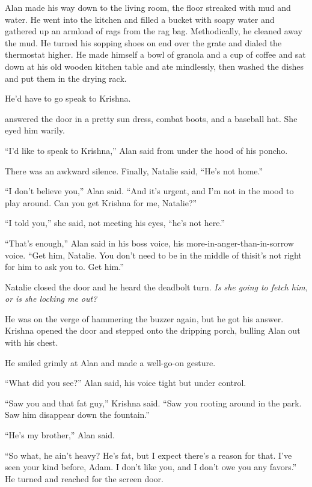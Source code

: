Alan made his way down to the living room, the floor streaked with mud
and water.  He went into the kitchen and filled a bucket with soapy
water and gathered up an armload of rags from the rag bag. 
Methodically, he cleaned away the mud.  He turned his sopping shoes on
end over the grate and dialed the thermostat higher.  He made himself
a bowl of granola and a cup of coffee and sat down at his old wooden
kitchen table and ate mindlessly, then washed the dishes and put them
in the drying rack.

He'd have to go speak to Krishna.

 answered the door in a pretty sun dress, combat boots, and a
baseball hat.  She eyed him warily.

``I'd like to speak to Krishna,'' Alan said from under the hood of his
poncho.

There was an awkward silence.  Finally, Natalie said, ``He's not
home.''

``I don't believe you,'' Alan said.  ``And it's urgent, and I'm not in
the mood to play around.  Can you get Krishna for me, Natalie?''

``I told you,'' she said, not meeting his eyes, ``he's not here.''

``That's enough,'' Alan said in his boss voice, his
more-in-anger-than-in-sorrow voice.  ``Get him, Natalie.  You don't
need to be in the middle of this\dash{}it's not right for him to ask you
to.  Get him.''

Natalie closed the door and he heard the deadbolt turn.  \textit{Is
she going to fetch him, or is she locking me out?}

He was on the verge of hammering the buzzer again, but he got his
answer.  Krishna opened the door and stepped onto the dripping porch,
bulling Alan out with his chest.

He smiled grimly at Alan and made a well-go-on gesture.

``What did you see?'' Alan said, his voice tight but under control.

``Saw you and that fat guy,'' Krishna said.  ``Saw you rooting around
in the park.  Saw him disappear down the fountain.''

``He's my brother,'' Alan said.

``So what, he ain't heavy?  He's fat, but I expect there's a reason
for that.  I've seen your kind before, Adam.  I don't like you, and I
don't owe you any favors.'' He turned and reached for the screen door.

